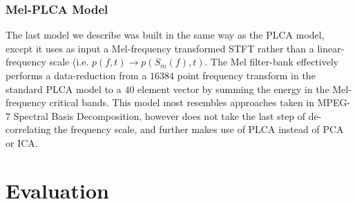 \documentclass[a4paper,10pt,final]{ThesisStyle}
\begin{document}

\subsubsection{Mel-PLCA Model}

The last model we describe was built in the same way as the PLCA model, except it uses as input a Mel-frequency transformed STFT rather than a linear-frequency scale (i.e. $p(f,t) \rightarrow p(S_m(f),t)$.  The Mel filter-bank effectively performs a data-reduction from a $16384$ point frequency transform in the standard PLCA model to a $40$ element vector by summing the energy in the Mel-frequency critical bands.  This model most resembles approaches taken in MPEG-7 Spectral Basis Decomposition, however does not take the last step of de-correlating the frequency scale, and further makes use of PLCA instead of PCA or ICA.  %

\section{Evaluation}



\end{document}
